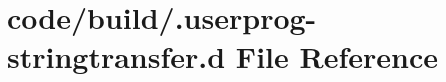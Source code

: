 \section{code/build/.userprog-\/stringtransfer.d File Reference}
\label{_8userprog-stringtransfer_8d}
